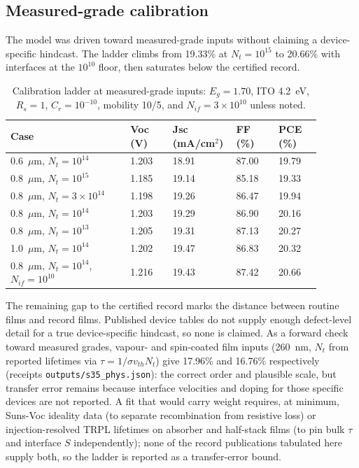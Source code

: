 \documentclass[11pt,a4paper]{article}
\begin{document}
\subsection{Measured-grade calibration}

The model was driven toward measured-grade inputs without claiming a device-specific hindcast. The ladder climbs from 19.33\% at $N_t=10^{15}$ to 20.66\% with interfaces at the $10^{10}$ floor, then saturates below the certified record.

\begin{table}[tbp]
\centering
\caption{Calibration ladder at measured-grade inputs: $E_g=1.70$, ITO 4.2~eV, $R_s=1$, $C_r=10^{-10}$, mobility 10/5, and $N_{if}=3\times10^{10}$ unless noted.}
\label{tab:calib}
\small
\begingroup
\setlength{\tabcolsep}{3pt}
\begin{tabular}{|p{0.34\linewidth}|p{0.12\linewidth}|p{0.18\linewidth}|p{0.12\linewidth}|p{0.12\linewidth}|}
\hline\hline
Case & Voc (V) & Jsc (mA/cm$^2$) & FF (\%) & PCE (\%) \\
\hline
0.6~$\mu$m, $N_t=10^{14}$ & 1.203 & 18.91 & 87.00 & 19.79 \\
0.8~$\mu$m, $N_t=10^{15}$ & 1.185 & 19.14 & 85.18 & 19.33 \\
0.8~$\mu$m, $N_t=3\times10^{14}$ & 1.198 & 19.26 & 86.47 & 19.94 \\
0.8~$\mu$m, $N_t=10^{14}$ & 1.203 & 19.29 & 86.90 & 20.16 \\
0.8~$\mu$m, $N_t=10^{13}$ & 1.205 & 19.31 & 87.13 & 20.27 \\
1.0~$\mu$m, $N_t=10^{14}$ & 1.202 & 19.47 & 86.83 & 20.32 \\
0.8~$\mu$m, $N_t=10^{14}$, $N_{if}=10^{10}$ & 1.216 & 19.43 & 87.42 & 20.66 \\
\hline\hline
\end{tabular}
\endgroup
\end{table}

The remaining gap to the certified record marks the distance between routine films and record films. Published device tables do not supply enough defect-level detail for a true device-specific hindcast, so none is claimed. As a forward check toward measured grades, vapour- and spin-coated film inputs (260~nm, $N_t$ from reported lifetimes via $\tau=1/\sigma v_{th}N_t$) give 17.96\% and 16.76\% respectively (receipts \texttt{outputs/s35\_phys.json}): the correct order and plausible scale, but transfer error remains because interface velocities and doping for those specific devices are not reported. A fit that would carry weight requires, at minimum, Suns-Voc ideality data (to separate recombination from resistive loss) or injection-resolved TRPL lifetimes on absorber and half-stack films (to pin bulk $\tau$ and interface $S$ independently); none of the record publications tabulated here supply both, so the ladder is reported as a transfer-error bound.
\end{document}

